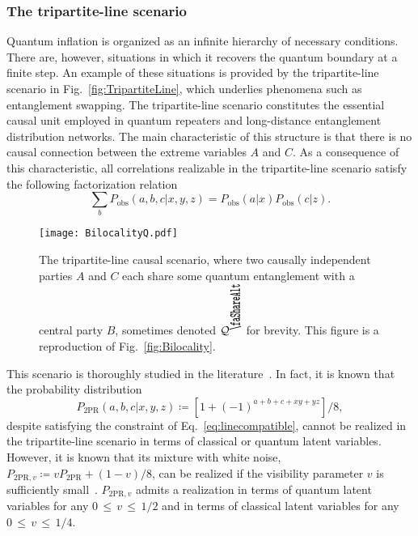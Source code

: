 \documentclass[superscriptaddress,aps,prx,nofootinbib,twocolumn,twoside,reprint,letterpaper,longbibliography]{revtex4-2}
\newcommand{\biloc}{\text{\scalebox{2}[1]{\rotatebox{90}{\faShareAlt}}}}
\begin{document}
\subsubsection{The tripartite-line scenario}\label{sec:Bilocality}
Quantum inflation is organized as an infinite hierarchy of necessary conditions. There are, however, situations in which it recovers the quantum boundary at a finite step. An example of these situations is provided by the tripartite-line scenario in Fig.~\ref{fig:TripartiteLine}, which underlies phenomena such as entanglement swapping. The tripartite-line scenario constitutes the essential causal unit employed in quantum repeaters and long-distance entanglement distribution networks.
The main characteristic of this structure is that there is no causal connection between the extreme variables $A$ and $C$.
As a consequence of this characteristic, all correlations realizable in the tripartite-line scenario satisfy the following factorization relation
\begin{equation}
    \sum_b P_\text{obs}(a,b,c|x,y,z)=P_\text{obs}(a|x)P_\text{obs}(c|z).
    \label{eq:linecompatible}
\end{equation}

\begin{figure}[t]
\centering
\texttt{[image: BilocalityQ.pdf]}
  \caption[]{\label{fig:TripartiteLine}
  The tripartite-line causal scenario, where two causally independent parties $A$ and $C$ each share some quantum entanglement with a central party $B$, sometimes denoted $\mathcal{Q}^{{\protect\biloc}}$ for brevity. This figure is a reproduction of Fig.~\ref{fig:Bilocality}.}
  \label{fig:BilocalityCopy}
\end{figure}
This scenario is thoroughly studied in the literature~\cite{branciard2010bilocality,branciard2012bilocality}.
In fact, it is known that the probability distribution
\begin{equation}
    {P_{\text{2PR}}(a,b,c|x,y,z)\coloneqq\left[1+(-1)^{a+b+c+xy+yz}\right]/8},
\end{equation}
despite satisfying the constraint of Eq.~\eqref{eq:linecompatible}, cannot be realized in the tripartite-line scenario in terms of classical or quantum latent variables.
However, it is known that its mixture with white noise, \mbox{$P_{\text{2PR},v}\coloneqq vP_{\text{2PR}}+(1-v)/8$}, can be realized if the visibility parameter $v$ is sufficiently small~\cite{branciard2012bilocality}.
$P_{\text{2PR},v}$ admits a realization in terms of quantum latent variables for any $0 \,{\leq}\, v \,{\leq}\, 1/2$ and in terms of classical latent variables for any $0 \,{\leq}\, v \,{\leq}\, 1/4$.
\end{document}
